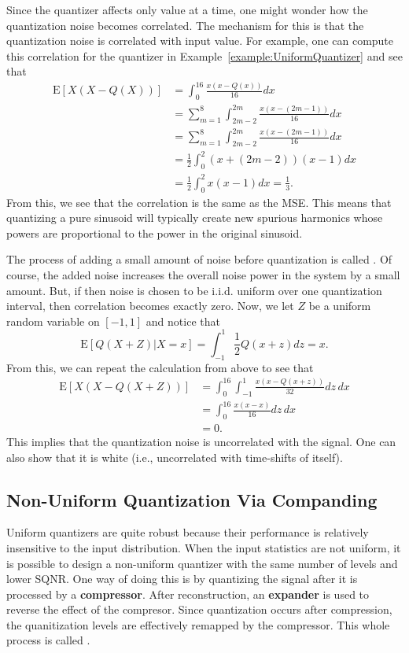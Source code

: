 Since the quantizer affects only value at a time, one might wonder how the quantization noise becomes correlated.
The mechanism for this is that the quantization noise is correlated with input value.
For example, one can compute this correlation for the quantizer in Example~\ref{example:UniformQuantizer} and see that
\begin{align*}
\mathrm{E} \left[X \left(X - Q(X)\right) \right] 
&= \int_0^{16} \frac{x(x - Q(x))}{16} dx \\
&= \sum_{m=1}^8 \int_{2m-2}^{2m} \frac{x(x - (2m - 1))}{16} dx \\
&= \sum_{m=1}^8 \int_{2m-2}^{2m} \frac{x(x - (2m - 1))}{16} dx \\
&= \frac{1}{2} \int_{0}^{2} (x+(2m-2))(x - 1) dx \\
&= \frac{1}{2} \int_{0}^{2} x(x - 1) dx = \frac{1}{3}.
\end{align*}
From this, we see that the correlation is the same as the MSE.
This means that quantizing a pure sinusoid will typically create new spurious harmonics whose powers are proportional to the power in the original sinusoid.

The process of adding a small amount of noise before quantization is called .
Of course, the added noise increases the overall noise power in the system by a small amount.
But, if then noise is chosen to be i.i.d. uniform over one quantization interval, then correlation becomes exactly zero.
Now, we let $Z$ be a uniform random variable on $[-1,1]$ and notice that
\[  \mathrm{E} \left[Q(X+Z)|X=x \right] = \int_{-1}^{1} \frac{1}{2} Q(x+z) dz = x. \]
From this, we can repeat the calculation from above to see that
\begin{align*}
\mathrm{E} \left[X \left(X - Q(X+Z)\right) \right] 
&= \int_0^{16} \int_{-1}^{1} \frac{x(x - Q(x+z))}{32} dz \, dx \\
&= \int_0^{16} \frac{x(x - x)}{16} dz \, dx \\
&= 0.
\end{align*}
This implies that the quantization noise is uncorrelated with the signal.
One can also show that it is white (i.e., uncorrelated with time-shifts of itself).


\subsection{Non-Uniform Quantization Via Companding}

Uniform quantizers are quite robust because their performance is relatively insensitive to the input distribution.
When the input statistics are not uniform, it is possible to design a non-uniform quantizer with the same number of levels and lower SQNR.
One way of doing this is by quantizing the signal after it is processed by a \textbf{compressor}.
After reconstruction, an \textbf{expander} is used to reverse the effect of the compresor.
Since quantization occurs after compression, the quanitization levels are effectively remapped by the compressor.
This whole process is called .

